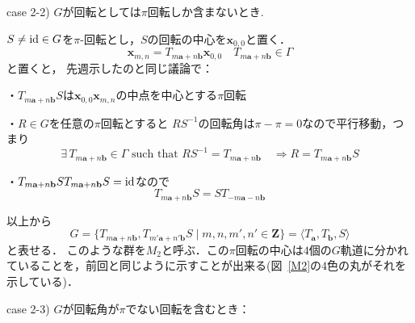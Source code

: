 \emptyline

case 2-2) $G$が回転としては$\pi$回転しか含まないとき.

$S\neq \operatorname{id}\in G$を$\pi$-回転とし，$S$の回転の中心を$\mathbf x_{0,0}$と置く．
\[
	\mathbf x_{m,n} 
	=T_{m\mathbf a+n\mathbf b}\mathbf x_{0,0} \quad 
	T_{m\mathbf a+n\mathbf b}\in \Gamma 
\]
と置くと，
先週示したのと同じ議論で：
\emptyline

・$T_{m\mathbf a+n\mathbf b}S$は$\mathbf x_{0,0}\mathbf x_{m,n} $の中点を中心とする$\pi$回転
\emptyline


・$R\in G$を任意の$\pi$回転とすると
$RS^{-1}$の回転角は$\pi-\pi=0$なので平行移動，つまり
\[
	\exists\,  T_{m\mathbf a+n\mathbf b}\in \Gamma  
	\text{ such that } 
	RS^{-1}=T_{m\mathbf a+n\mathbf b}\quad
	\Rightarrow R=T_{m\mathbf a+n\mathbf b}S
\]

・$T_{m\mathbf a+n\mathbf b}ST_{m\mathbf a+n\mathbf b}S=\operatorname{id}$なので
\[
	T_{m\mathbf a+n\mathbf b}S=ST_{-m\mathbf a-n\mathbf b}
\]

以上から
\[
	G = \{T_{m\mathbf a+n\mathbf b}, T_{m'\mathbf a+n'\mathbf b}S\mid m,n, m', n'\in \mathbf Z\}
	=\langle T_{\mathbf a}, T_{\mathbf b}, S \rangle
\]
と表せる．
このような群を$M_2$と呼ぶ．この$\pi$回転の中心は$4$個の$G$軌道に分かれていることを，前回と同じように示すことが出来る(図~\ref{M2}の$4$色の丸がそれを示している)．
\emptyline


case 2-3) $G$が回転角が$\pi$でない回転を含むとき：

